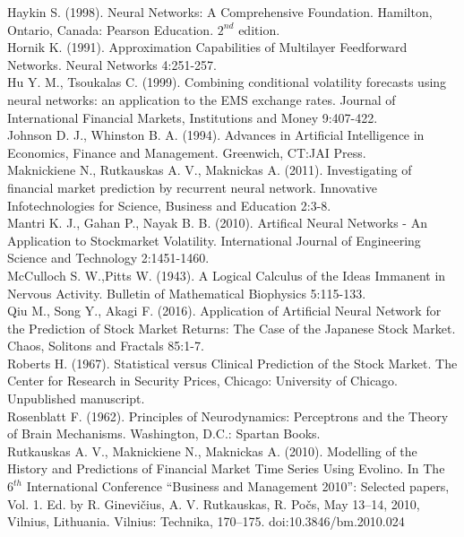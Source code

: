 \documentclass[12pt, letterpaper]{amsart}%
\begin{document}
Haykin S. (1998). Neural Networks: A Comprehensive Foundation. Hamilton, Ontario, Canada: Pearson Education. $2^{nd}$ edition.
\\

Hornik K. (1991). Approximation Capabilities of Multilayer Feedforward Networks. Neural Networks 4:251-257.
\\

Hu Y. M., Tsoukalas C. (1999). Combining conditional volatility forecasts using neural networks: an application to the EMS exchange rates. Journal of International Financial Markets, Institutions and Money 9:407-422.
\\

Johnson D. J., Whinston B. A. (1994). Advances in Artificial Intelligence in Economics, Finance and Management. Greenwich, CT:JAI Press.
\\

Maknickiene N., Rutkauskas A. V., Maknickas A. (2011). Investigating of financial market prediction by recurrent neural network. Innovative Infotechnologies for Science, Business and Education 2:3-8.
\\

Mantri K. J., Gahan P., Nayak B. B. (2010). Artifical Neural Networks - An Application to Stockmarket Volatility. International Journal of Engineering Science and Technology 2:1451-1460.
\\

McCulloch S. W.,Pitts W. (1943). A Logical Calculus of the Ideas Immanent in Nervous Activity. Bulletin of Mathematical Biophysics 5:115-133.
\\

Qiu M., Song Y., Akagi F. (2016). Application of Artificial Neural Network for the Prediction of Stock Market Returns: The Case of the Japanese Stock Market. Chaos, Solitons and Fractals 85:1-7.
\\

Roberts H. (1967). Statistical versus Clinical Prediction of the Stock Market. The Center for Research in Security Prices, Chicago: University of Chicago. Unpublished manuscript.
\\

Rosenblatt F. (1962). Principles of Neurodynamics: Perceptrons and the Theory of Brain Mechanisms. Washington, D.C.: Spartan Books.
\\

Rutkauskas A. V., Maknickiene N., Maknickas A. (2010). Modelling of the History and Predictions of Financial Market Time Series Using Evolino. In The $6^{th}$ International Conference “Business and Management 2010”: Selected papers, Vol. 1. Ed. by R. Ginevičius, A. V. Rutkauskas, R. Počs, May 13–14, 2010, Vilnius, Lithuania. Vilnius: Technika, 170–175. doi:10.3846/bm.2010.024
\\
\end{document}
